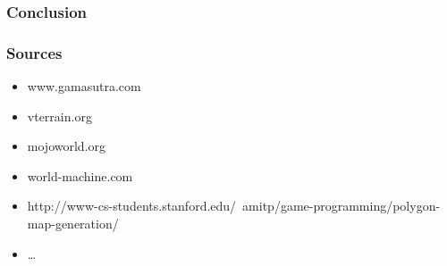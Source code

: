\documentclass{beamer}
\begin{document}
\begin{frame}
  \frametitle{Conclusion}
\end{frame}

\begin{frame}
  \frametitle{Sources}
  \begin{itemize}
  \item www.gamasutra.com
  \item vterrain.org
  \item mojoworld.org %
  \item world-machine.com
  \item http://www-cs-students.stanford.edu/~amitp/game-programming/polygon-map-generation/
  \item \dots
  \end{itemize}
\end{frame}
\end{document}
